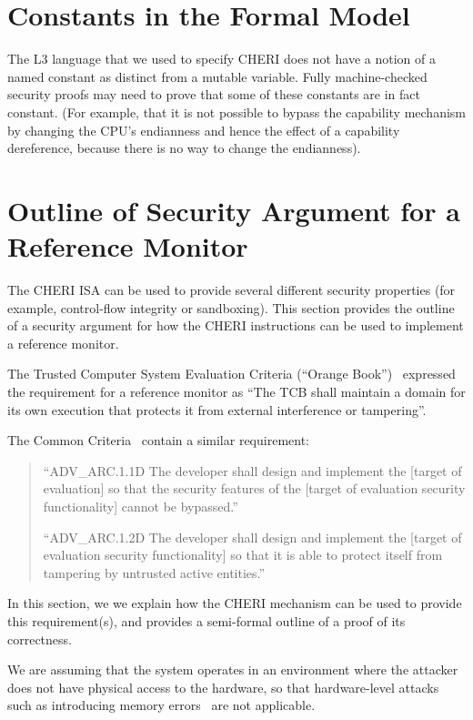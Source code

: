 \section{Constants in the Formal Model}

The L3 language that we used to specify CHERI does not have a notion of
a named constant as distinct from a mutable variable. Fully machine-checked
security proofs may need to prove that some of these constants are in fact
constant. (For example, that it is not possible to bypass the capability
mechanism by changing the CPU's endianness and hence the effect of a capability
dereference, because there is no way to change the endianness).

\section{Outline of Security Argument for a Reference Monitor}

The CHERI ISA can be used to provide several different security properties (for
example, control-flow integrity or sandboxing). This section provides the 
outline of a security argument for how the CHERI instructions can be used
to implement a reference monitor.

The Trusted Computer System Evaluation Criteria (``Orange Book'')~\cite{TCSEC}
expressed the requirement for a reference monitor as ``The TCB shall maintain
a domain for its own execution that protects it from external interference or
tampering''.

The Common Criteria~\cite{CC2012-3} contain a similar requirement:

\begin{quote}
``ADV\_ARC.1.1D The developer shall design and implement the [target of
evaluation] so that the security features of the [target of evaluation
security functionality] cannot be bypassed.''

``ADV\_ARC.1.2D The developer shall design and implement the [target of
evaluation security functionality] so that it is able to protect itself from
tampering by untrusted active entities.''
\end{quote}

In this section, we we explain how the CHERI mechanism can be used
to provide this requirement(s), and provides a semi-formal outline of a
proof of its correctness.

We are assuming that the system operates in an environment where
the attacker does not have physical access to the hardware, so that
hardware-level attacks such as introducing memory errors~\cite{Govinda+03}
are not applicable. 

